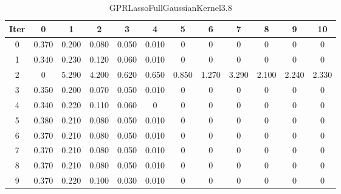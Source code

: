 \begin{table}
	\begin{center}
		\begin{tabular}{|c|c|c|c|c|c|c|c|c|c|c|c|}
			\hline
			Iter & 0 & 1 & 2 & 3 & 4 & 5 & 6 & 7 & 8 & 9 & 10 \\
			\hline
			0 & 0.370 & 0.200 & 0.080 & 0.050 & 0.010 & 0 & 0 & 0 & 0 & 0 & 0 \\
			\hline
			1 & 0.340 & 0.230 & 0.120 & 0.060 & 0.010 & 0 & 0 & 0 & 0 & 0 & 0 \\
			\hline
			2 & 0 & 5.290 & 4.200 & 0.620 & 0.650 & 0.850 & 1.270 & 3.290 & 2.100 & 2.240 & 2.330 \\
			\hline
			3 & 0.350 & 0.200 & 0.070 & 0.050 & 0.010 & 0 & 0 & 0 & 0 & 0 & 0 \\
			\hline
			4 & 0.340 & 0.220 & 0.110 & 0.060 & 0 & 0 & 0 & 0 & 0 & 0 & 0 \\
			\hline
			5 & 0.380 & 0.210 & 0.080 & 0.050 & 0.010 & 0 & 0 & 0 & 0 & 0 & 0 \\
			\hline
			6 & 0.370 & 0.210 & 0.080 & 0.050 & 0.010 & 0 & 0 & 0 & 0 & 0 & 0 \\
			\hline
			7 & 0.370 & 0.210 & 0.080 & 0.050 & 0.010 & 0 & 0 & 0 & 0 & 0 & 0 \\
			\hline
			8 & 0.370 & 0.210 & 0.080 & 0.050 & 0.010 & 0 & 0 & 0 & 0 & 0 & 0 \\
			\hline
			9 & 0.370 & 0.220 & 0.100 & 0.030 & 0.010 & 0 & 0 & 0 & 0 & 0 & 0 \\
			\hline
		\end{tabular}
	\end{center}
	\caption{GPRLassoFullGaussianKernel3.8}
\end{table}